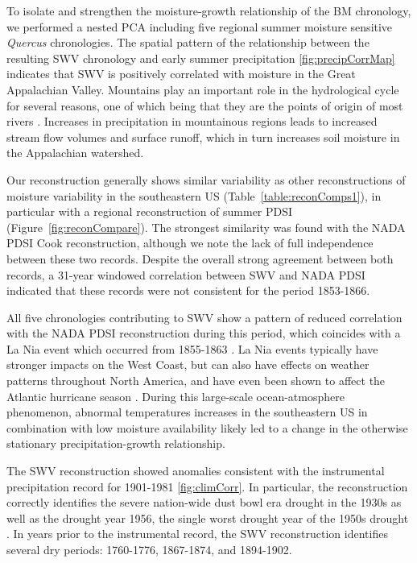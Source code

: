 To isolate and strengthen the moisture-growth relationship of the BM
chronology, we performed a nested PCA including five regional summer
moisture sensitive \textit{Quercus} chronologies. The spatial pattern of
the relationship between the resulting SWV chronology and early summer
precipitation \ref{fig:precipCorrMap} indicates that SWV is positively
correlated with moisture in the Great Appalachian Valley. Mountains
play an important role in the hydrological cycle for several reasons,
one of which being that they are the points of origin of most rivers
\cite{beniston1997climatic}. Increases in precipitation in mountainous
regions leads to increased stream flow volumes and surface runoff,
which in turn increases soil moisture in the Appalachian watershed.

Our reconstruction generally shows similar variability as other
reconstructions of moisture variability in the southeastern US
(Table~\ref{table:reconComps1}), in particular with a regional
reconstruction of summer PDSI (Figure~\ref{fig:reconCompare}). The
strongest similarity was found with the NADA PDSI Cook reconstruction,
although we note the lack of full independence between these two
records. Despite the overall strong agreement between both records,
a 31-year windowed correlation between SWV and NADA PDSI indicated that
these records were not consistent for the period 1853-1866.

All five chronologies contributing to SWV show a pattern of reduced
correlation with the NADA PDSI reconstruction during this period,
which coincides with a La Nia event which occurred from
1855-1863 \cite{cole2002multiyear}. La Nia events typically have
stronger impacts on the West Coast, but can also have effects on weather
patterns throughout North America, and have even been shown to affect the
Atlantic hurricane season \cite{pielke1999nina}. During this large-scale
ocean-atmosphere phenomenon, abnormal temperatures increases in the
southeastern US in combination with low moisture availability likely led
to a change in the otherwise stationary precipitation-growth relationship.

The SWV reconstruction showed anomalies consistent with the instrumental
precipitation record for 1901-1981 \ref{fig:climCorr}. In particular,
the reconstruction correctly identifies the severe nation-wide dust bowl
era drought in the 1930s as well as the drought year 1956, the single
worst drought year of the 1950s drought \cite{fye2003paleoclimatic}. In
years prior to the instrumental record, the SWV reconstruction identifies
several dry periods: 1760-1776, 1867-1874, and 1894-1902.


